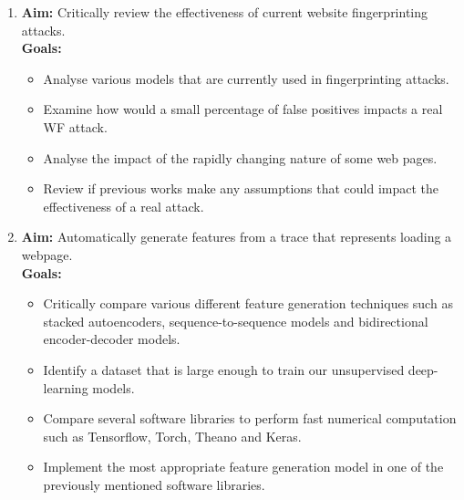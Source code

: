 \begin{enumerate}
   \item \textbf{Aim:} Critically review the effectiveness of current website fingerprinting attacks.\\
   \textbf{Goals:}
   \begin{itemize}
      \item Analyse various models that are currently used in fingerprinting attacks.
      \item Examine how would a small percentage of false positives impacts a real WF attack.
      \item Analyse the impact of the rapidly changing nature of some web pages.
      \item Review if previous works make any assumptions that could impact the effectiveness of a real attack.
   \end{itemize}

   \item \textbf{Aim:} Automatically generate features from a trace that represents loading a webpage.\\
   \textbf{Goals:}
   \begin{itemize}
      \item Critically compare various different feature generation techniques such as stacked autoencoders, sequence-to-sequence models and bidirectional encoder-decoder models.
      \item Identify a dataset that is large enough to train our unsupervised deep-learning models.
      \item Compare several software libraries to perform fast numerical computation such as Tensorflow, Torch, Theano and Keras.
      \item Implement the most appropriate feature generation model in one of the previously mentioned software libraries.
   \end{itemize}


\end{enumerate}
